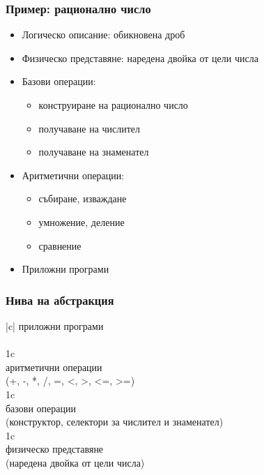 \documentclass{beamer}
\begin{document}
\begin{frame}[<+->]
  \frametitle{Пример: рационално число}

  \begin{itemize}
  \item Логическо описание: обикновена дроб
  \item Физическо представяне: наредена двойка от цели числа
  \item Базови операции:
    \begin{itemize}[<.->]
    \item конструиране на рационално число
    \item получаване на числител
    \item получаване на знаменател
    \end{itemize}
  \item Аритметични операции:
    \begin{itemize}[<.->]
    \item събиране, изваждане
    \item умножение, деление
    \item сравнение
    \end{itemize}
  \item Приложни програми
  \end{itemize}
\end{frame}


\begin{frame}
  \frametitle{Нива на абстракция}

  \renewcommand{\bua}{\bigg\uparrow}

  \begin{center}
    \begin{tabular}{|c|}
      \hline
      приложни програми\\
      \\
      \hline
      \multicolumn 1c\bua\\
      \hline
      аритметични операции\\
      (+, -, *, /, =, <, >, <=, >=)\\
      \hline
      \multicolumn 1c\bua\\
      \hline
      базови операции\\
      (конструктор, селектори за числител и знаменател)\\
      \hline
      \multicolumn 1c\bua\\
      \hline
      физическо представяне\\
      (наредена двойка от цели числа)\\
      \hline
    \end{tabular}
  \end{center}
\end{frame}
\end{document}
